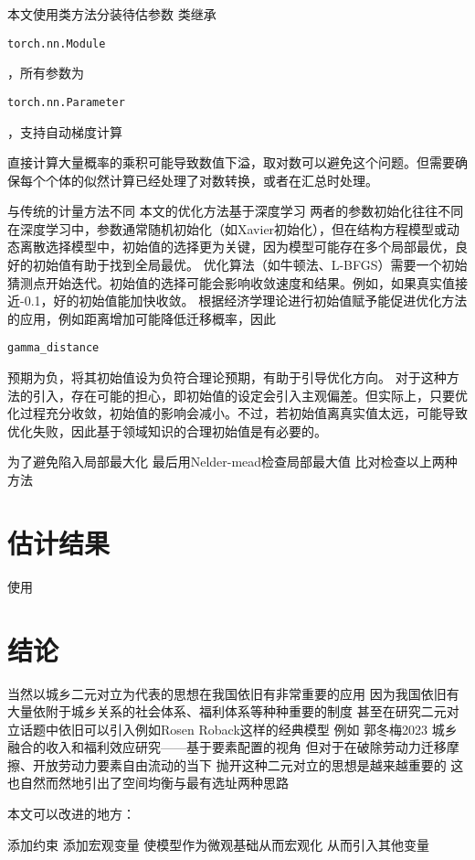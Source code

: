 \documentclass{article}
\numberwithin{equation}{section} %
\begin{document}
本文使用类方法分装待估参数
类继承\begin{verbatim}torch.nn.Module\end{verbatim}，所有参数为\begin{verbatim}torch.nn.Parameter\end{verbatim}，支持自动梯度计算

直接计算大量概率的乘积可能导致数值下溢，取对数可以避免这个问题。但需要确保每个个体的似然计算已经处理了对数转换，或者在汇总时处理。

与传统的计量方法不同
本文的优化方法基于深度学习
两者的参数初始化往往不同
在深度学习中，参数通常随机初始化（如Xavier初始化），但在结构方程模型或动态离散选择模型中，初始值的选择更为关键，因为模型可能存在多个局部最优，良好的初始值有助于找到全局最优。
优化算法（如牛顿法、L-BFGS）需要一个初始猜测点开始迭代。初始值的选择可能会影响收敛速度和结果。例如，如果真实值接近-0.1，好的初始值能加快收敛。
根据经济学理论进行初始值赋予能促进优化方法的应用，例如距离增加可能降低迁移概率，因此\begin{verbatim}gamma_distance\end{verbatim}预期为负，将其初始值设为负符合理论预期，有助于引导优化方向。
对于这种方法的引入，存在可能的担心，即初始值的设定会引入主观偏差。但实际上，只要优化过程充分收敛，初始值的影响会减小。不过，若初始值离真实值太远，可能导致优化失败，因此基于领域知识的合理初始值是有必要的。


为了避免陷入局部最大化
最后用Nelder-mead检查局部最大值
比对检查以上两种方法

\section{估计结果}

使用




\section{结论}
当然以城乡二元对立为代表的思想在我国依旧有非常重要的应用 因为我国依旧有大量依附于城乡关系的社会体系、福利体系等种种重要的制度
甚至在研究二元对立话题中依旧可以引入例如Rosen Roback这样的经典模型
例如 郭冬梅2023 城乡融合的收入和福利效应研究——基于要素配置的视角
但对于在破除劳动力迁移摩擦、开放劳动力要素自由流动的当下
抛开这种二元对立的思想是越来越重要的
这也自然而然地引出了空间均衡与最有选址两种思路

本文可以改进的地方：

添加约束
添加宏观变量
使模型作为微观基础从而宏观化
从而引入其他变量
\end{document}
